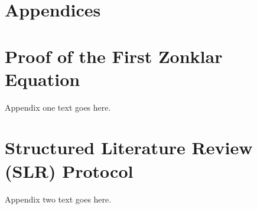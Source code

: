 \appendix

\chapter*{Appendices}
\label{cha:appendices}

\chapter{Proof of the First Zonklar Equation}
\label{app:zonklar}

Appendix one text goes here.

\chapter{Structured Literature Review (SLR) Protocol}
\label{app:slr}

Appendix two text goes here.
